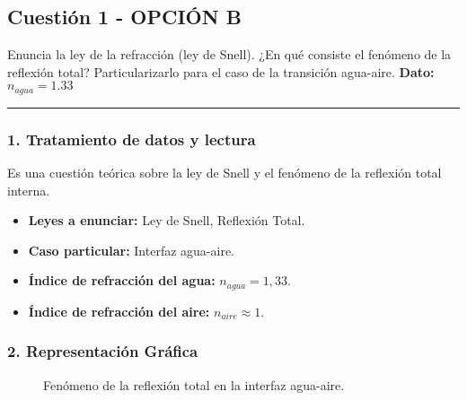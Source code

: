 \newpage

\subsection{Cuestión 1 - OPCIÓN B}
\label{subsec:3B_2001_sep_ext}

\begin{cajaenunciado}
Enuncia la ley de la refracción (ley de Snell). ¿En qué consiste el fenómeno de la reflexión total? Particularizarlo para el caso de la transición agua-aire.
\textbf{Dato:} $n_{agua}=1.33$
\end{cajaenunciado}
\hrule

\subsubsection*{1. Tratamiento de datos y lectura}
Es una cuestión teórica sobre la ley de Snell y el fenómeno de la reflexión total interna.
\begin{itemize}
    \item \textbf{Leyes a enunciar:} Ley de Snell, Reflexión Total.
    \item \textbf{Caso particular:} Interfaz agua-aire.
    \item \textbf{Índice de refracción del agua:} $n_{agua} = 1,33$.
    \item \textbf{Índice de refracción del aire:} $n_{aire} \approx 1$.
\end{itemize}

\subsubsection*{2. Representación Gráfica}
\begin{figure}[H]
    \centering
    \caption{Fenómeno de la reflexión total en la interfaz agua-aire.}
\end{figure}

